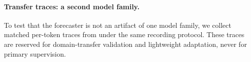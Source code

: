 \paragraph{Transfer traces: a second model family.}
To test that the forecaster is not an artifact of one model family, we
collect matched per-token traces from
 under the same
recording protocol. These traces are reserved for domain-transfer validation
and lightweight adaptation, never for primary supervision.
